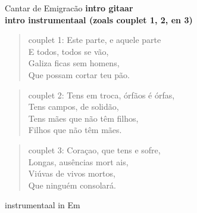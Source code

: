 \begin{song}[fado]{Cantar de Emigracão}
	\textbf{intro gitaar}\\
	\textbf{intro instrumentaal (zoals couplet 1, 2, en 3)}
	
\begin{verse}{couplet 1:}
	Este parte, e aquele parte\\
	E todos, todos se vão,\\
	Galiza ficas sem homens,\\
	Que possam cortar teu pão. \phantom{xxxx}
\end{verse}
\begin{verse}{couplet 2:}
	Tens em troca, órfãos é  órfas,\\
	Tens campos, de solidão,\\
	Tens mães que não têm filhos,\\
	Filhos que não têm mães. \phantom{xxxx}
\end{verse}
\begin{verse}{couplet 3:}
	Coraçao, que tens e sofre,\\
	Longas, ausências mort ais,\\
	Viúvas de vivos mortos,\\
	Que ninguém consolará. \phantom{xxxxxx}
\end{verse}
\begin{instrumental}{instrumentaal in Em}
	 \\
	\\
\end{instrumental}


\end{song}
